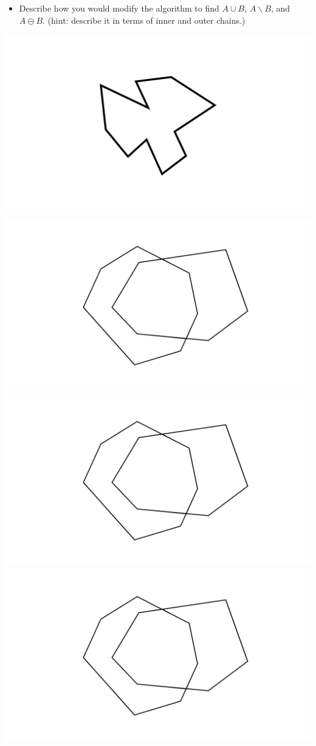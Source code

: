 \documentclass[a4paper,12pt]{article}
\begin{document}
\begin{enumerate}
\begin{itemize}
\item Describe how you would modify the algorithm to find $A \cup B$, $A \backslash B$, and $A \ominus B$. (hint: describe it in terms of inner and outer chains.)
\end{itemize}


\end{enumerate}

\worksheetSubmission


\newpage

\begin{center}
\includegraphics[width=0.8\linewidth]{../images/worksheet2a.pdf}
\end{center}

\newpage

\includegraphics[width=0.3\linewidth]{../images/worksheet2b_no_color.pdf}\hfill
\includegraphics[width=0.3\linewidth]{../images/worksheet2b_no_color.pdf}\hfill
\includegraphics[width=0.3\linewidth]{../images/worksheet2b_no_color.pdf}
\end{document}
